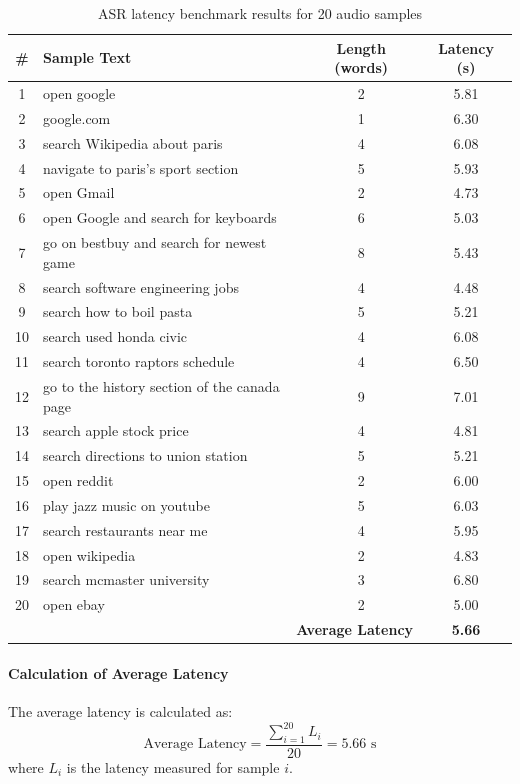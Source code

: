 \documentclass[12pt, titlepage]{article}
\begin{document}
\begin{table}[H]
\centering
\caption{ASR latency benchmark results for 20 audio samples}
\begin{tabular}{|c|p{7cm}|c|c|}
\hline
\textbf{\#} & \textbf{Sample Text} & \textbf{Length (words)} & \textbf{Latency (s)} \\ \hline
1  & open google & 2 & 5.81 \\ \hline
2  & google.com & 1 & 6.30 \\ \hline
3  & search Wikipedia about paris & 4 & 6.08 \\ \hline
4  & navigate to paris's sport section & 5 & 5.93 \\ \hline
5  & open Gmail & 2 & 4.73 \\ \hline
6  & open Google and search for keyboards & 6 & 5.03 \\ \hline
7  & go on bestbuy and search for newest game & 8 & 5.43 \\ \hline
8  & search software engineering jobs & 4 & 4.48 \\ \hline
9  & search how to boil pasta & 5 & 5.21 \\ \hline
10 & search used honda civic & 4 & 6.08 \\ \hline
11 & search toronto raptors schedule & 4 & 6.50 \\ \hline
12 & go to the history section of the canada page & 9 & 7.01 \\ \hline
13 & search apple stock price & 4 & 4.81 \\ \hline
14 & search directions to union station & 5 & 5.21 \\ \hline
15 & open reddit & 2 & 6.00 \\ \hline
16 & play jazz music on youtube & 5 & 6.03 \\ \hline
17 & search restaurants near me & 4 & 5.95 \\ \hline
18 & open wikipedia & 2 & 4.83 \\ \hline
19 & search mcmaster university & 3 & 6.80 \\ \hline
20 & open ebay & 2 & 5.00 \\ \hline
\multicolumn{3}{|r|}{\textbf{Average Latency}} & \textbf{5.66} \\ \hline
\end{tabular}
\label{tab:asr-latency-benchmark}
\end{table}

\paragraph{Calculation of Average Latency}
The average latency is calculated as:
\[
\text{Average Latency} = \frac{\sum_{i=1}^{20} L_i}{20} = 5.66 \text{ s}
\]
where \(L_i\) is the latency measured for sample \(i\).
\end{document}

